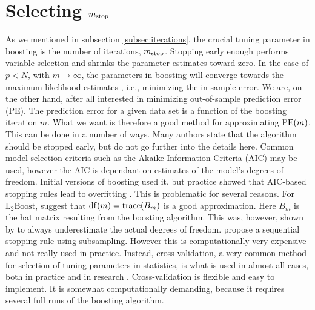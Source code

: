 \section{Selecting $m_{\text{stop}}$}
As we mentioned in subsection \ref{subsec:iterations}, the crucial tuning parameter in boosting is the number of iterations, $m_{\text{stop}}$. 
Stopping early enough performs variable selection and shrinks the parameter estimates toward zero.
In the case of $p<N$, with $m\to\infty$, the parameters in boosting will converge towards the maximum likelihood estimates \citep{DeBin2016}, i.e., minimizing the in-sample error.
We are, on the other hand, after all interested in minimizing out-of-sample prediction error (PE).
The prediction error for a given data set is a function of the boosting iteration $m$.
What we want is therefore a good method for approximating $\operatorname{PE}(m)$.
This can be done in a number of ways.
Many authors state that the algorithm should be stopped early, but do not go further into the details here.
Common model selection criteria such as the Akaike Information Criteria (AIC) may be used, however the AIC is dependant on estimates of the model's degrees of freedom. 
Initial versions of boosting used it, but practice showed that AIC-based stopping rules lead to overfitting \citep{mayr-hofner}.
This is problematic for several reasons.
For $\text{L}_2\text{Boost}$, \citet{buhlmann2007} suggest that $\operatorname{df}(m)=\operatorname{trace}(B_m)$ is a good approximation.
Here $B_m$ is the hat matrix resulting from the boosting algorithm.
This was, however, shown by \citet{hastie2007} to always underestimate the actual degrees of freedom.
\citet{mayr-hofner} propose a sequential stopping rule using subsampling.
However this is computationally very expensive and not really used in practice.
Instead, cross-validation, a very common method for selection of tuning parameters in statistics, is what is used in almost all cases, both in practice and in research \citep{mayr14a,mayr14b,mayr17}.
Cross-validation is flexible and easy to implement. It is somewhat computationally demanding, because it requires several full runs of the boosting algorithm.



